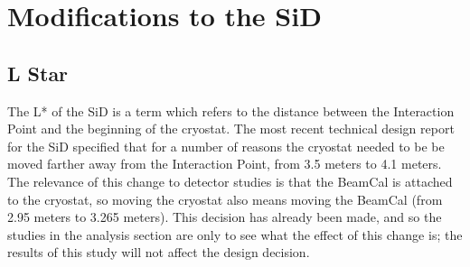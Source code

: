 \documentclass{report}
\begin{document}
        \section{Modifications to the SiD}
            \subsection{L Star}

                The L* of the SiD is a term which refers to the distance between the Interaction Point and the beginning of the cryostat. The most recent technical design report for the SiD specified that for a number of reasons the cryostat needed to be be moved farther away from the Interaction Point, from 3.5 meters to 4.1 meters. The relevance of this change to detector studies is that the BeamCal is attached to the cryostat, so moving the cryostat also means moving the BeamCal (from 2.95 meters to 3.265 meters). This decision has already been made, and so the studies in the analysis section are only to see what the effect of this change is; the results of this study will not affect the design decision.


\end{document}
